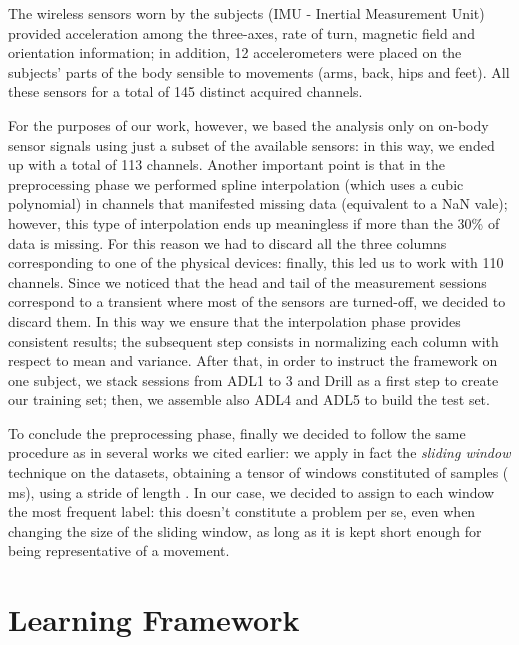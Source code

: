The wireless sensors worn by the subjects (IMU - Inertial Measurement Unit) provided acceleration among the three-axes, rate of turn, magnetic field and orientation information; in addition, 12 accelerometers were placed on the subjects' parts of the body sensible to movements (arms, back, hips and feet). All these sensors for a total of 145 distinct acquired channels. 

For the purposes of our work, however, we based the analysis only on on-body sensor signals using just a subset of the available sensors: in this way, we ended up with a total of 113 channels. Another important point is that in the preprocessing phase we performed spline interpolation (which uses a cubic polynomial) in channels that manifested missing data (equivalent to a NaN vale); however, this type of interpolation ends up meaningless if more than the 30\% of data is missing. For this reason we had to discard all the three columns corresponding to one of the physical devices: finally, this led us to work with 110 channels. Since we noticed that the head and tail of the measurement sessions correspond to a transient where most of the sensors are turned-off, we decided to discard them. In this way we ensure that the interpolation phase provides consistent results; the subsequent step consists in normalizing each column with respect to mean and variance. After that, in order to instruct the framework on one subject, we stack sessions from ADL1 to 3 and Drill as a first step to create our training set; then, we assemble also ADL4 and ADL5 to build the test set. 

To conclude the preprocessing phase, finally we decided to follow the same procedure as in several works we cited earlier: we apply in fact the \textit{sliding window} technique on the datasets, obtaining a tensor of windows constituted of  samples ( ms), using a stride of length . In our case, we decided to assign to each window the most frequent label: this doesn't constitute a problem per se, even when changing the size of the sliding window, as long as it is kept short enough for being representative of a movement.



\section{Learning Framework}
\label{sec:learning_framework}


